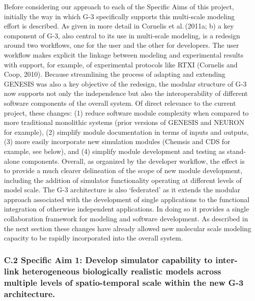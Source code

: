 \documentclass[12pt]{article}
\begin{document}
\noindent Before considering our approach to each of the Specific Aims
of this project, initially the way in which
G-3 specifically supports this multi-scale modeling effort is described. As
given in more detail in Cornelis et al.\,(2011a; b) a key
component of G-3, also central to its use in multi-scale
modeling, is a redesign around two workflows, one for the user and the
other for developers. The user workflow makes explicit the
linkage between modeling and experimental results with support, for
example, of experimental protocols like RTXI (Cornelis and Coop,
2010).  Because streamlining the
process of adapting and extending GENESIS was also a key objective of
the redesign, the modular structure of G-3 now supports not only the
independence but also the interoperability of different software
components of the overall system. Of direct relevance to the current
project, these changes: (1) reduce software module complexity 
when compared to more traditional monolithic systems (prior versions
of GENESIS and NEURON for example), (2) simplify module documentation
 in terms of inputs and outputs, (3) more easily incorporate
new simulation modules (Chemsis and CDS for example, see below),
and (4) simplify module development and testing as stand-alone
components. Overall, as organized by the developer workflow, the effect is to provide a much clearer
delineation of the scope of new module development, including the addition of simulator functionality operating
at different levels of model scale.  The G-3 architecture is also
`federated' as it extends the modular approach associated with the
development of single applications to the functional integration of
otherwise independent applications. In doing so it provides a single
collaboration framework for modeling and software development. As
described in the next section these changes have already allowed
new molecular scale modeling capacity to be rapidly incorporated into the
overall system.\\ %

\subsubsection*{C.2 Specific Aim 1: Develop simulator capability to inter-link heterogeneous biologically realistic models across multiple levels of spatio-temporal scale within the new G-3 architecture.}
\end{document}
